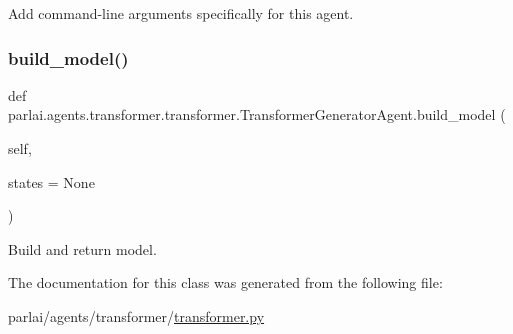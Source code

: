 \begin{DoxyVerb}Add command-line arguments specifically for this agent.
\end{DoxyVerb}
 \mbox{\label{classparlai_1_1agents_1_1transformer_1_1transformer_1_1TransformerGeneratorAgent_a473f2a19d6bce412c4c9163c7beb9b09}} 
\subsubsection{\texorpdfstring{build\+\_\+model()}{build\_model()}}
{\footnotesize\ttfamily def parlai.\+agents.\+transformer.\+transformer.\+Transformer\+Generator\+Agent.\+build\+\_\+model (\begin{DoxyParamCaption}\item[{}]{self,  }\item[{}]{states = {\ttfamily None} }\end{DoxyParamCaption})}

\begin{DoxyVerb}Build and return model.
\end{DoxyVerb}
 

The documentation for this class was generated from the following file\+:\begin{DoxyCompactItemize}
\item 
parlai/agents/transformer/\hyperlink{transformer_8py}{transformer.\+py}\end{DoxyCompactItemize}
